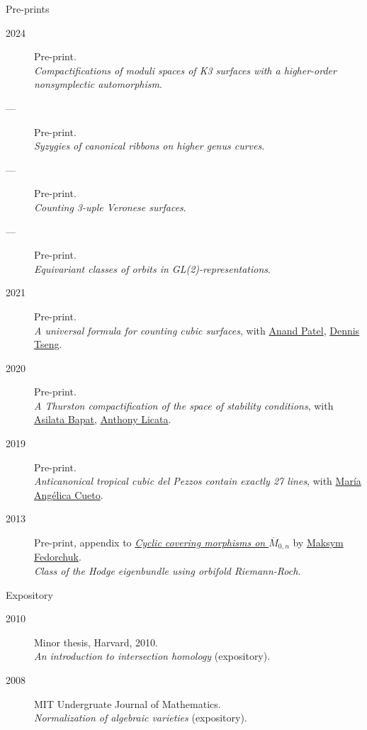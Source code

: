 \documentclass[11pt]{article}
\begin{document}
\begin{description}
\item[{Pre-prints}] 
\end{description}
\label{org73d5964}
\begin{description}
\item[{2024}] Pre-print.\\
\emph{Compactifications of moduli spaces of K3 surfaces with a higher-order nonsymplectic automorphism}.
\item[{---}] Pre-print.\\
\emph{Syzygies of canonical ribbons on higher genus curves}.
\item[{---}] Pre-print.\\
\emph{Counting 3-uple Veronese surfaces}.
\item[{---}] Pre-print.\\
\emph{Equivariant classes of orbits in GL(2)-representations}.
\item[{2021}] Pre-print.\\
\emph{A universal formula for counting cubic surfaces}, with \href{https://sites.google.com/view/anand-patel}{Anand Patel}, \href{https://sites.google.com/view/dennis-tseng}{Dennis Tseng}.
\item[{2020}] Pre-print.\\
\emph{A Thurston compactification of the space of stability conditions}, with \href{https://asilata.org/}{Asilata Bapat}, \href{https://maths-people.anu.edu.au/\~licatat/}{Anthony Licata}.
\item[{2019}] Pre-print.\\
\emph{Anticanonical tropical cubic del Pezzos contain exactly 27 lines}, with \href{https://people.math.osu.edu/cueto.5/}{María Angélica Cueto}.
\item[{2013}] Pre-print, appendix to \href{https://drive.google.com/file/d/1wq-Fh3DiqODc51t-J0phIexVF7B4lxsY/view}{\emph{Cyclic covering morphisms on \(\overline M_{0,n}\)}} by \href{https://www2.bc.edu/maksym-fedorchuk/}{Maksym Fedorchuk}.\\
\emph{Class of the Hodge eigenbundle using orbifold Riemann-Roch}.
\end{description}

\begin{description}
\item[{Expository}] 
\end{description}
\label{orgb3e5b10}
\begin{description}
\item[{2010}] Minor thesis, Harvard, 2010.\\
\emph{An introduction to intersection homology} (expository).
\item[{2008}] MIT Undergruate Journal of Mathematics.\\
\emph{Normalization of algebraic varieties} (expository).
\end{description}
\end{document}
